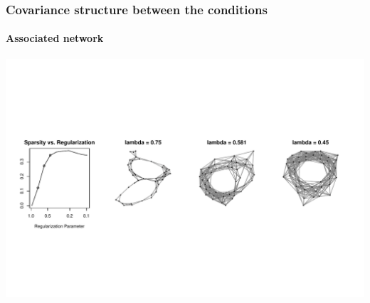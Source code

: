 \begin{frame}
\frametitle{Covariance structure between the conditions}
\framesubtitle{Associated network}

\begin{knitrout}\scriptsize
{}\color{fgcolor}\begin{kframe}
\begin{alltt}
\end{alltt}
\end{kframe}
\includegraphics[width=.8\textwidth]{figures/r_show_plasmodium_glasso2-1} 

\end{knitrout}

\end{frame}

